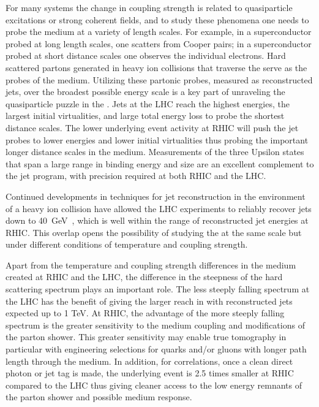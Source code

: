 For many systems the change in coupling strength is related to
quasiparticle excitations or strong coherent fields, and to study
these phenomena one needs to probe the medium at a variety of length
scales.  For example, in a superconductor probed at long length
scales, one scatters from Cooper pairs; in a superconductor probed at
short distance scales one observes the individual electrons.  Hard
scattered partons generated in heavy ion collisions that traverse the
\qgp serve as the probes of the medium.  Utilizing these partonic
probes, measured as reconstructed jets, over the broadest possible
energy scale is a key part of unraveling the quasiparticle puzzle in
the \qgp.  Jets at the LHC reach the highest energies, the largest initial
virtualities, and large total energy loss to probe the shortest distance scales. The lower
underlying event activity at RHIC will push the jet probes to lower energies and lower
initial virtualities thus probing the important longer distance scales in the medium.
Measurements of the three Upsilon states that span a large range in binding energy 
and size are an excellent complement to the jet program, with precision required at 
both RHIC and the LHC.

Continued developments in techniques for jet reconstruction in the
environment of a heavy ion collision have allowed the LHC experiments
to reliably recover jets down to
40~GeV~\cite{Aad:2013sla,Aad:2012vca}, which is well within the range
of reconstructed jet energies at RHIC.  This overlap opens the
possibility of studying the \qgp at the same scale but under different
conditions of temperature and coupling strength.

Apart from the temperature and coupling strength differences in the medium created
at RHIC and the LHC, the difference in the steepness of the hard scattering \pt spectrum
plays an important role.   The less steeply falling spectrum at the LHC has the benefit
of giving the larger reach in \pt with reconstructed jets expected up to 1 TeV.   At RHIC,
the advantage of the more steeply falling spectrum is the greater sensitivity to the medium
coupling and \qgp modifications of the parton shower.   This greater sensitivity may enable
true tomography in particular with engineering selections for quarks and/or gluons with longer
path length through the medium.   In addition, for correlations, once a clean direct photon or jet
tag is made, the underlying event is 2.5 times smaller at RHIC compared to the LHC thus giving
cleaner access to the low energy remnants of the parton shower and possible medium response.

